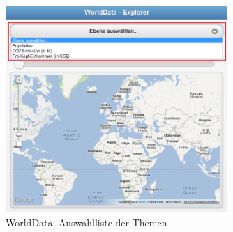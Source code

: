 \begin{figure}[H]
	\centering
	\includegraphics[width=0.75\textwidth]{images/usecase1-worlddata/documentation/worlddata-application_start}
	\caption{WorldData: Auswahlliste der Themen}
	\label{worlddata-application_start}
\end{figure}